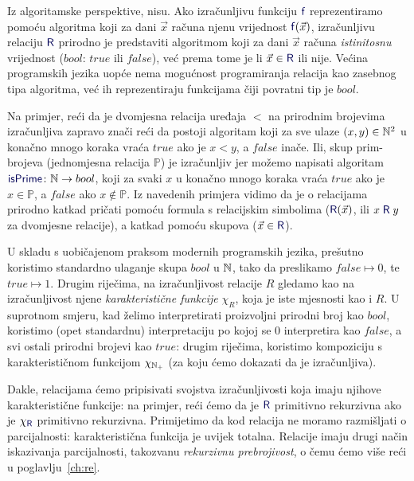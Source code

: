 Iz algoritamske perspektive, nisu. Ako izračunljivu funkciju $\f{f}$ reprezentiramo po\-mo\-ću algoritma koji za dani $\vec x$ računa njenu vrijednost $\f{f}(\vec x)$, izračunljivu relaciju $\f{R}$ prirodno je predstaviti algoritmom koji za dani $\vec x$ računa \emph{istinitosnu} vrijednost ($bool$: $\mathit{true}$ ili $\mathit{false}$), već prema tome je li $\vec x\in\f{R}$ ili nije. Većina programskih jezika uopće nema mogućnost programiranja relacija kao zasebnog tipa algoritma, već ih reprezentiraju funkcijama čiji povratni tip je $bool$.

Na primjer, reći da je dvomjesna relacija uređaja $<$ na prirodnim brojevima iz\-ra\-čun\-lji\-va zapravo znači reći da postoji algoritam koji za sve ulaze $(x,y)\in{\mathbb N}^2$ u konačno mnogo koraka vraća $\mathit{true}$ ako je $x<y$, a $\mathit{false}$ inače. Ili, skup prim-brojeva (jednomjesna relacija $\mathbb P$) je izračunljiv jer možemo napisati algoritam $\f{isPrime}\colon\N\to bool$, koji za svaki $x$ u konačno mnogo koraka vraća $\mathit{true}$ ako je $x\in\mathbb P$, a $\mathit{false}$ ako $x\not\in\mathbb P$. Iz navedenih primjera vidimo da je o relacijama prirodno katkad pričati pomoću formula s relacijskim simbolima ($\f{R}(\vec x)$, ili $x\mathrel{\f R}y$ za dvomjesne relacije), a katkad pomoću skupova ($\vec x\in\f{R}$).

U skladu s uobičajenom praksom modernih programskih jezika, prešutno koristimo standardno ulaganje skupa $bool$ u ${\mathbb N}$, tako da preslikamo $\mathit{false}\mapsto 0$, te $\mathit{true}\mapsto 1$. Drugim riječima, na izračunljivost relacije $R$ gledamo kao na izračunljivost njene \emph{karakteristične funkcije} $\chi_R$, koja je iste mjesnosti kao i $R$. U suprotnom smjeru, kad želimo interpretirati proizvoljni prirodni broj kao $bool$, koristimo (opet standardnu) interpretaciju po kojoj se $0$ interpretira kao $\mathit{false}$, a svi ostali prirodni brojevi kao $\mathit{true}$: drugim riječima, koristimo kompoziciju s karakterističnom funkcijom $\chi_{{\mathbb N}_+}$ (za koju ćemo dokazati da je izračunljiva).

Dakle, relacijama ćemo pripisivati svojstva izračunljivosti koja imaju njihove karakteristične funkcije: na primjer, reći ćemo da je $\f{R}$ primitivno rekurzivna ako je $\chi_{\f{R}}$ primitivno rekurzivna. Primijetimo da kod relacija ne moramo razmišljati o parcijalnosti: karakteristična funkcija je uvijek totalna. Relacije imaju drugi način iskazivanja parcijalnosti, takozvanu \emph{rekurzivnu prebrojivost}, o čemu ćemo više reći u poglavlju~\ref{ch:re}.

